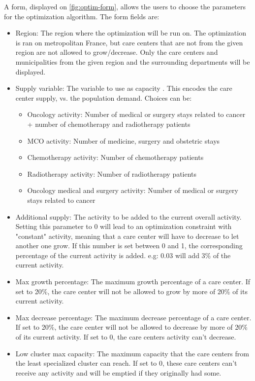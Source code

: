 A form, displayed on \cref{fig:optim-form}, allows the users to choose the parameters for the optimization algorithm. The form fields are:

\begin{itemize}
    \item Region: The region where the optimization will be run on. The optimization is ran on metropolitan France, but care centers that are not from the given region are not allowed to grow/decrease. Only the care centers and municipalities from the given region and the surrounding departments will be displayed.
    \item Supply variable: The variable to use as capacity . This encodes the care center supply, vs. the population demand. Choices can be:
    \begin{itemize}
        \item Oncology activity: Number of medical or surgery stays related to cancer + number of chemotherapy and radiotherapy patients
        \item MCO activity: Number of medicine, surgery and obstetric stays
        \item Chemotherapy activity: Number of chemotherapy patients
        \item Radiotherapy activity: Number of radiotherapy patients
        \item Oncology medical and surgery activity: Number of medical or surgery stays related to cancer
    \end{itemize}
    \item Additional supply: The activity to be added to the current overall activity. Setting this parameter to 0 will lead to an optimization constraint with "constant" activity, meaning that a care center will have to decrease to let another one grow. If this number is set between 0 and 1, the corresponding percentage of the current activity is added. e.g: 0.03 will add 3\% of the current activity.
    \item Max growth percentage: The maximum growth percentage of a care center. If set to 20\%, the care center will not be allowed to grow by more of 20\% of its current activity.
    \item Max decrease percentage: The maximum decrease percentage of a care center. If set to 20\%, the care center will not be allowed to decrease by more of 20\% of its current activity. If set to 0, the care centers activity can't decrease.
    \item Low cluster max capacity: The maximum capacity that the care centers from the least specialized cluster can reach. If set to 0, these care centers can't receive any activity and will be emptied if they originally had some.

\end{itemize}
